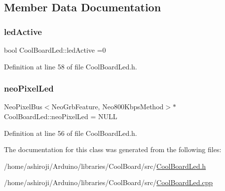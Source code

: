 \subsection{Member Data Documentation}
\mbox{\label{class_cool_board_led_aadd04d2ecf123247718d77f42fba7f08}} 
\subsubsection{\texorpdfstring{led\+Active}{ledActive}}
{\footnotesize\ttfamily bool Cool\+Board\+Led\+::led\+Active =0\hspace{0.3cm}{\ttfamily [private]}}



Definition at line 58 of file Cool\+Board\+Led.\+h.

\mbox{\label{class_cool_board_led_ac2c13fa462a010cd9242bf297c013923}} 
\subsubsection{\texorpdfstring{neo\+Pixel\+Led}{neoPixelLed}}
{\footnotesize\ttfamily Neo\+Pixel\+Bus$<$Neo\+Grb\+Feature, Neo800\+Kbps\+Method$>$$\ast$ Cool\+Board\+Led\+::neo\+Pixel\+Led = N\+U\+LL\hspace{0.3cm}{\ttfamily [private]}}



Definition at line 56 of file Cool\+Board\+Led.\+h.



The documentation for this class was generated from the following files\+:\begin{DoxyCompactItemize}
\item 
/home/ashiroji/\+Arduino/libraries/\+Cool\+Board/src/\hyperlink{_cool_board_led_8h}{Cool\+Board\+Led.\+h}\item 
/home/ashiroji/\+Arduino/libraries/\+Cool\+Board/src/\hyperlink{_cool_board_led_8cpp}{Cool\+Board\+Led.\+cpp}\end{DoxyCompactItemize}
